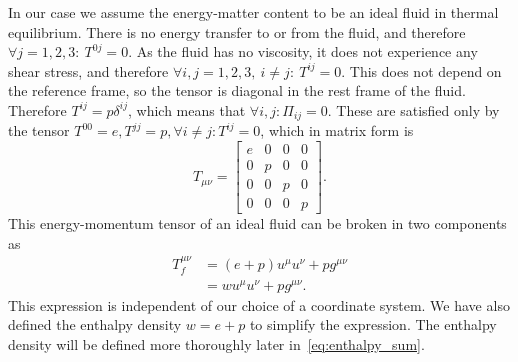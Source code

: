 In our case we assume the energy-matter content to be an ideal fluid in thermal equilibrium.
There is no energy transfer to or from the fluid, and therefore
$\forall j=1,2,3: \ T^{0j} = 0$.
As the fluid has no viscosity, it does not experience any shear stress, and therefore
$\forall i,j=1,2,3, \ i \neq j: \ T^{ij} = 0$.
This does not depend on the reference frame, so the tensor is diagonal in the rest frame of the fluid.
Therefore $T^{ij} = p \delta^{ij}$, which means that
$\forall i,j: \Pi_{ij} = 0$.
These are satisfied only by the tensor $T^{00}=e, T^{jj}=p, \forall i \neq j: T^{ij}=0$, which in matrix form is
\begin{equation}
T_{\mu \nu} =
\begin{bmatrix}
e & 0 & 0 & 0 \\
0 & p & 0 & 0 \\
0 & 0 & p & 0 \\
0 & 0 & 0 & p
\end{bmatrix}.
\end{equation}
This
energy-momentum tensor of an ideal fluid can be broken in two components as
\cites[eq. 5.11, 5.23]{lecture_notes}[eq. 4.12]{rasanen_gr_2022}
\begin{align}
T^{\mu \nu}_f
&= (e+p) u^\mu u^\nu + p g^{\mu \nu}
\label{eq:ep_tensor} \\
&= w u^\mu u^\nu + p g^{\mu \nu}.
\end{align}
This expression is independent of our choice of a coordinate system.
We have also defined the enthalpy density $w = e+p$ to simplify the expression.
The enthalpy density will be defined more thoroughly later in~\eqref{eq:enthalpy_sum}.

